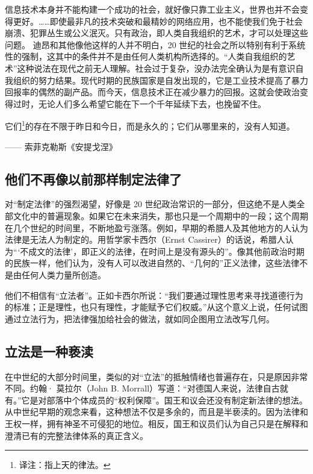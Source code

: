 信息技术本身并不能构建一个成功的社会，就好像只靠工业主义，世界也并不会变得更好。……即使最非凡的技术突破和最精妙的网络应用，也不能使我们免于社会崩溃、犯罪丛生或公义泯灭。只有政治，即人类自我组织的艺术，才可以处理这些问题。 迪昂和其他像他这样的人并不明白，20 世纪的社会之所以特别有利于系统性的强制，这其中的条件并不是由任何人类机构所选择的。“人类自我组织的艺术”这种说法在现代之前无人理解。社会过于复杂，没办法完全确认为是有意识自我组织的努力结果。现代时期的民族国家是自发出现的，它是工业技术提高了暴力回报率的偶然的副产品。而今天，信息技术正在减少暴力的回报。这就会使政治变得过时，无论人们多么希望它能在下一个千年延续下去，也挽留不住。

\begin{tcolorbox}
\kaishu 它们\footnote{译注：指上天的律法。}的存在不限于昨日和今日，而是永久的；它们从哪里来的，没有人知道。
\begin{flushright}
—— 索菲克勒斯《安提戈涅》 
\end{flushright}
\end{tcolorbox}


\subsection{他们不再像以前那样制定法律了}

对“制定法律”的强烈渴望，好像是 20 世纪政治常识的一部分，但这绝不是人类全部文化中的普遍现象。如果它在未来消失，那也只是一个周期中的一段；这个周期在几个世纪的时间里，不断地盈亏涨落。例如，早期的希腊人及其他地方的人认为法律是无法人为制定的。用哲学家卡西尔（Ernst Cassirer）的话说，希腊人认为“‘不成文的法律’，即正义的法律，在时间上是没有源头的”。像其他前政治时期的民族一样，他们认为，没有人可以改进自然的、“几何的”正义法律，这些法律不是由任何人类力量所创造。

他们不相信有“立法者”。正如卡西尔所说：“我们要通过理性思考来寻找道德行为的标准；正是理性，也只有理性，才能赋予它们权威。”从这个意义上说，任何试图通过立法行为，把法律强加给社会的做法，就如同企图用立法改写几何。

\subsection{立法是一种亵渎}
在中世纪的大部分时间里，类似的对“立法”的抵触情绪也普遍存在，只是原因非常不同。约翰· 莫拉尔（John B. Morrall）写道：“对德国人来说，法律自古就有。”它是对部落中个体成员的“权利保障”。国王和议会还没有制定新法律的想法。从中世纪早期的观念来看，这种想法不仅是多余的，而且是半亵渎的。因为法律和王权一样，拥有神圣不可侵犯的地位。相反，国王和议员们认为自己只是在解释和澄清已有的完整法律体系的真正含义。

